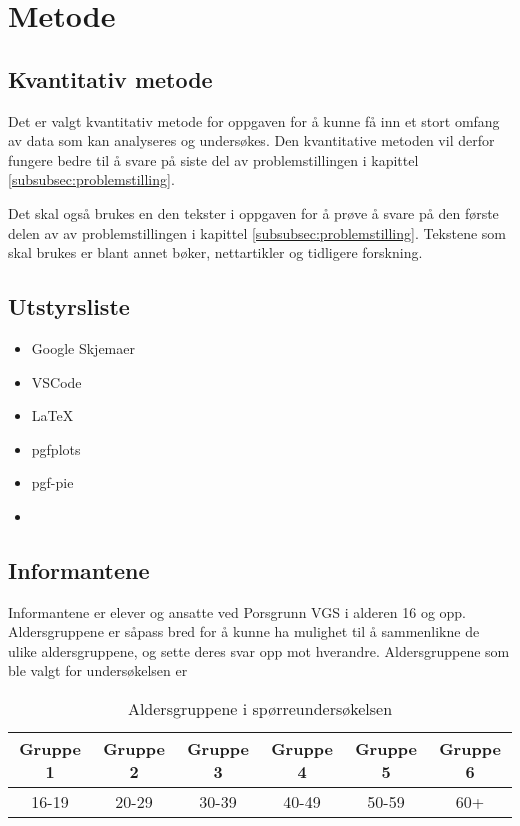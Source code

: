 \section{Metode}

\subsection{Kvantitativ metode}
Det er valgt kvantitativ metode for oppgaven for å kunne få inn et stort omfang av data som kan analyseres og undersøkes. Den kvantitative metoden vil derfor fungere bedre til å svare på siste del av problemstillingen i kapittel \ref{subsubsec:problemstilling}.

Det skal også brukes en den tekster i oppgaven for å prøve å svare på den første delen av av problemstillingen i kapittel \ref{subsubsec:problemstilling}. Tekstene som skal brukes er blant annet bøker, nettartikler og tidligere forskning.

\subsection{Utstyrsliste}
\begin{itemize}
    \item Google Skjemaer
    \item VSCode
    \item \LaTeX
    \item pgfplots
    \item pgf-pie
    \item 
\end{itemize}

\subsection{Informantene}
Informantene er elever og ansatte ved Porsgrunn VGS i alderen 16 og opp. Aldersgruppene er såpass bred for å kunne ha mulighet til å sammenlikne de ulike aldersgruppene, og sette deres svar opp mot hverandre. Aldersgruppene som ble valgt for undersøkelsen er

\begin{table}[h]
    \begin{center}
        \begin{tabular}{|c|c|c|c|c|c|}
            \hline
            Gruppe 1 & Gruppe 2 & Gruppe 3 & Gruppe 4 & Gruppe 5 & Gruppe 6 \\
            \hline
            16-19 & 20-29 & 30-39 & 40-49 & 50-59 & 60+ \\
            \hline
        \end{tabular}
        \caption{Aldersgruppene i spørreundersøkelsen}
    \end{center}
\end{table}

